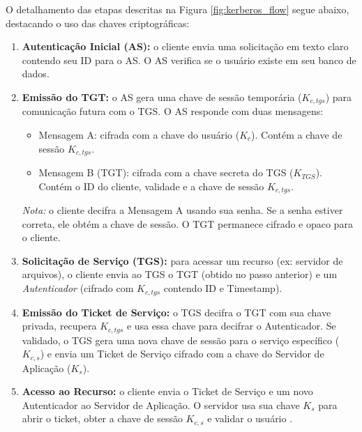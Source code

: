 O detalhamento das etapas descritas na Figura \ref{fig:kerberos_flow} segue abaixo, destacando o uso das chaves criptográficas:

\begin{enumerate}
    \item \textbf{Autenticação Inicial (AS):} o cliente envia uma solicitação em texto claro contendo seu ID para o AS. O AS verifica se o usuário existe em seu banco de dados.
    
    \item \textbf{Emissão do TGT:} o AS gera uma chave de sessão temporária ($K_{c,tgs}$) para comunicação futura com o TGS. O AS responde com duas mensagens:
    \begin{itemize}
        \item Mensagem A: cifrada com a chave do usuário ($K_c$). Contém a chave de sessão $K_{c,tgs}$.
        \item Mensagem B (TGT): cifrada com a chave secreta do TGS ($K_{TGS}$). Contém o ID do cliente, validade e a chave de sessão $K_{c,tgs}$.
    \end{itemize}
    \small{\textit{Nota:} o cliente decifra a Mensagem A usando sua senha. Se a senha estiver correta, ele obtém a chave de sessão. O TGT permanece cifrado e opaco para o cliente.}

    \item \textbf{Solicitação de Serviço (TGS):} para acessar um recurso (ex: servidor de arquivos), o cliente envia ao TGS o TGT (obtido no passo anterior) e um \textit{Autenticador} (cifrado com $K_{c,tgs}$ contendo ID e Timestamp).
    
    \item \textbf{Emissão do Ticket de Serviço:} o TGS decifra o TGT com sua chave privada, recupera $K_{c,tgs}$ e usa essa chave para decifrar o Autenticador. Se validado, o TGS gera uma nova chave de sessão para o serviço específico ($K_{c,s}$) e envia um Ticket de Serviço cifrado com a chave do Servidor de Aplicação ($K_s$).

    \item \textbf{Acesso ao Recurso:} o cliente envia o Ticket de Serviço e um novo Autenticador ao Servidor de Aplicação. O servidor usa sua chave $K_s$ para abrir o ticket, obter a chave de sessão $K_{c,s}$ e validar o usuário \cite{tanenbaum2017}.
\end{enumerate}

